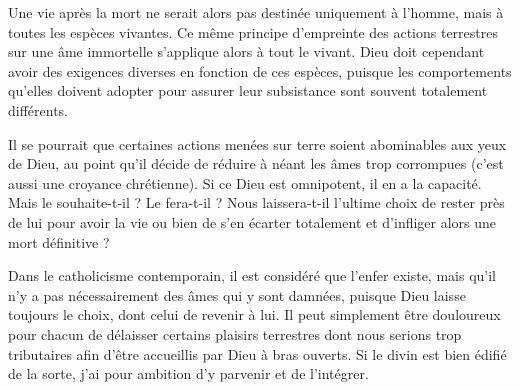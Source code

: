 Une vie après la mort ne serait alors pas destinée uniquement à l’homme, mais à toutes les espèces vivantes. Ce même principe d’empreinte des actions terrestres sur une âme immortelle s’applique alors à tout le vivant. Dieu doit cependant avoir des exigences diverses en fonction de ces espèces, puisque les comportements qu’elles doivent adopter pour assurer leur subsistance sont souvent totalement différents.

Il se pourrait que certaines actions menées sur terre soient abominables aux yeux de Dieu, au point qu’il décide de réduire à néant les âmes trop corrompues (c'est aussi une croyance chrétienne). Si ce Dieu est omnipotent, il en a la capacité. Mais le souhaite-t-il ? Le fera-t-il ? Nous laissera-t-il l’ultime choix de rester près de lui pour avoir la vie ou bien de s’en écarter totalement et d’infliger alors une mort définitive ?

Dans le catholicisme contemporain, il est considéré que l'enfer existe, mais qu'il n'y a pas nécessairement des âmes qui y sont damnées, puisque Dieu laisse toujours le choix, dont celui de revenir à lui. Il peut simplement être douloureux pour chacun de délaisser certains plaisirs terrestres dont nous serions trop tributaires afin d'être accueillis par Dieu à bras ouverts. Si le divin est bien édifié de la sorte, j'ai pour ambition d'y parvenir et de l'intégrer.